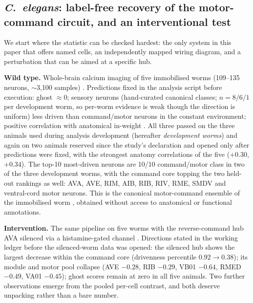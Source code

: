 \documentclass[11pt]{article}
\begin{document}
\subsection{\emph{C.~elegans}: label-free recovery of the motor-command circuit, and an interventional test}

We start where the statistic can be checked hardest: the only system in this paper that offers named cells, an independently mapped wiring diagram, and a perturbation that can be aimed at a specific hub.

\textbf{Wild type.} Whole-brain calcium imaging of five immobilised worms
(109--135 neurons, $\sim$3{,}100 samples) \citep{kato2015}.
Predictions fixed in the analysis script before execution: ghost
$\approx 0$; sensory neurons (hand-curated canonical classes; $n{=}8/6/1$
per development worm, so per-worm evidence is weak though the direction is
uniform) less driven than command/motor neurons in the constant
environment; positive correlation with anatomical in-weight
\citep{white1986,cook2019}. All three passed on the three animals used
during analysis development (hereafter \emph{development worms}) and
again on two animals reserved since the study's declaration and opened only
after predictions were fixed, with the strongest anatomy correlations of
the five ($+0.30$, $+0.34$). The top-10 most-driven neurons are 10/10 command/motor class in two of
the three development worms, with the command core topping the two held-out
rankings as well: AVA, AVE, RIM, AIB, RIB, RIV, RME, SMDV and
ventral-cord motor neurons. This is the canonical motor-command ensemble
of the immobilised worm \citep{kato2015}, obtained without access to
anatomical or functional annotations.

\textbf{Intervention.} The same pipeline on five worms with the
reverse-command hub AVA silenced via a histamine-gated channel
\citep{kato2015}. Directions stated in the working ledger before the
silenced-worm data was opened: the silenced hub shows the largest decrease within the command core (drivenness percentile $0.92\!\to\!0.38$); its
module and motor pool collapse (AVE $-0.28$, RIB $-0.29$, VB01 $-0.64$,
RMED $-0.49$, VA01 $-0.45$); ghost scores remain at zero in all five animals. Two further observations emerge from the pooled per-cell contrast, and both deserve unpacking rather than a bare number.
\end{document}
